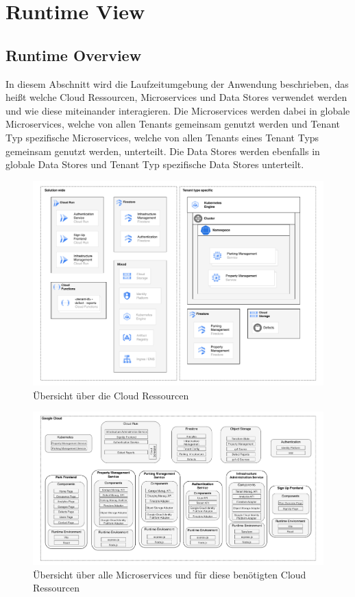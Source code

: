 \section{Runtime View}
\subsection{Runtime Overview}
In diesem Abschnitt wird die Laufzeitumgebung der Anwendung beschrieben, das heißt welche Cloud Ressourcen, Microservices und Data Stores verwendet werden und wie diese miteinander interagieren.
Die Microservices werden dabei in globale Microservices, welche von allen Tenants gemeinsam genutzt werden und Tenant Typ spezifische Microservices, welche von allen Tenants eines Tenant Typs gemeinsam genutzt werden, unterteilt.
Die Data Stores werden ebenfalls in globale Data Stores und Tenant Typ spezifische Data Stores unterteilt.

\begin{figure}[ht]
	\centering
	\includegraphics[width=\textwidth]{resources/03-runtime-view/pdf/cloud-ressources.pdf}
	\caption{Übersicht über die Cloud Ressourcen}
	\label{fig:cloud-ressources}
\end{figure}

\begin{figure}[ht]
	\centering
	\includegraphics[width=\textwidth]{resources/03-runtime-view/pdf/architecture.pdf}
	\caption{Übersicht über alle Microservices und für diese benötigten Cloud Ressourcen}
	\label{fig:system-architecture}
\end{figure}

